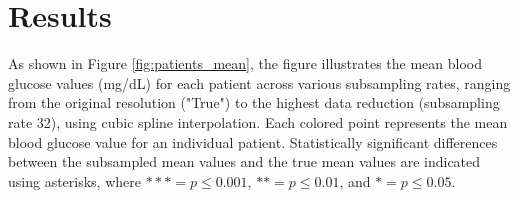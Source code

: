 
\section{Results}
As shown in Figure \ref{fig:patients_mean}, the figure illustrates the mean blood glucose values (mg/dL) for each patient across various subsampling rates, ranging from the original resolution ("True") to the highest data reduction (subsampling rate 32), using cubic spline interpolation. Each colored point represents the mean blood glucose value for an individual patient. Statistically significant differences between the subsampled mean values and the true mean values are indicated using asterisks, where $\ast \ast \ast = p \le 0.001$, $\ast \ast  = p \le 0.01$, and $\ast = p \le 0.05$.

